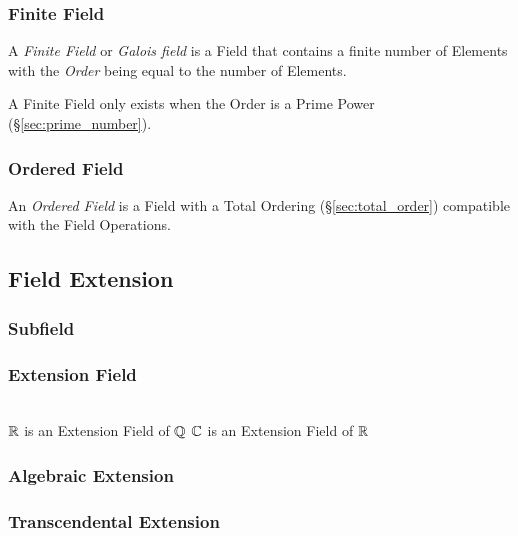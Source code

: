 \subsubsection{Finite Field}\label{sec:finite_field}

A \emph{Finite Field} or \emph{Galois field} is a Field that contains
a finite number of Elements with the \emph{Order} being equal to the
number of Elements.

A Finite Field only exists when the Order is a Prime Power
(\S\ref{sec:prime_number}).



\subsubsection{Ordered Field}\label{sec:ordered_field}

An \emph{Ordered Field} is a Field with a Total Ordering
(\S\ref{sec:total_order}) compatible with the Field Operations.



\subsection{Field Extension}\label{sec:field_extension}

\subsubsection{Subfield}\label{sec:subfield}

\subsubsection{Extension Field}\label{sec:extension_field}
\hfill \\

$\mathbb{R}$ is an Extension Field of $\mathbb{Q}$
$\mathbb{C}$ is an Extension Field of $\mathbb{R}$



\subsubsection{Algebraic Extension}\label{sec:algebraic_extension}

\subsubsection{Transcendental Extension}
\label{sec:transcendental_extension}




